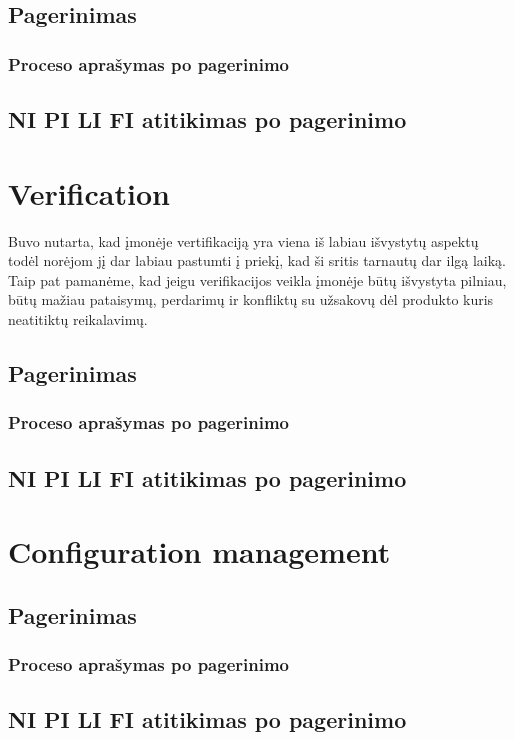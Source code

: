 \documentclass{VUMIFPSkursinis}
\begin{document}
		\subsection{Pagerinimas}
			\subsubsection{Proceso aprašymas po pagerinimo}
		\subsection{NI PI LI FI atitikimas po pagerinimo}
	\section{Verification}
		Buvo nutarta, kad įmonėje vertifikaciją yra viena iš labiau išvystytų aspektų todėl norėjom jį dar labiau pastumti į priekį, kad ši sritis tarnautų dar ilgą laiką. 
		Taip pat pamanėme, kad jeigu verifikacijos veikla įmonėje būtų išvystyta pilniau, būtų mažiau pataisymų, perdarimų ir konfliktų su užsakovų dėl produkto kuris neatitiktų reikalavimų.
		\subsection{Pagerinimas}
			\subsubsection{Proceso aprašymas po pagerinimo}
		\subsection{NI PI LI FI atitikimas po pagerinimo}
	\section{Configuration management}
		\subsection{Pagerinimas}
			\subsubsection{Proceso aprašymas po pagerinimo}
		\subsection{NI PI LI FI atitikimas po pagerinimo}
\end{document}
